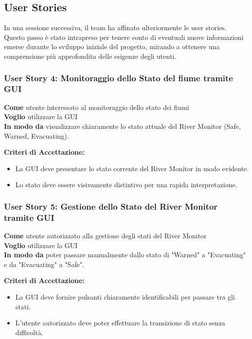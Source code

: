 \subsection{User Stories}

In una sessione successiva, il team ha affinato ulteriormente le user stories. Questo passo è stato intrapreso per tenere conto di eventuali nuove informazioni emerse durante lo sviluppo iniziale del progetto, mirando a ottenere una comprensione più approfondita delle esigenze degli utenti.

\subsubsection{User Story 4: Monitoraggio dello Stato del fiume tramite GUI}

\textbf{Come} utente interessato al monitoraggio dello stato dei fiumi \\
\textbf{Voglio} utilizzare la GUI \\
\textbf{In modo da} visualizzare chiaramente lo stato attuale del River Monitor (Safe, Warned, Evacuating).

\textbf{Criteri di Accettazione:}
\begin{itemize}
  \item La GUI deve presentare lo stato corrente del River Monitor in modo evidente.
  \item Lo stato deve essere visivamente distintivo per una rapida interpretazione.
\end{itemize}

\subsubsection{User Story 5: Gestione dello Stato del River Monitor tramite GUI}

\textbf{Come} utente autorizzato alla gestione degli stati del River Monitor \\
\textbf{Voglio} utilizzare la GUI \\
\textbf{In modo da}  poter passare manualmente dallo stato di "Warned" a "Evacuating" e da "Evacuating" a "Safe".

\textbf{Criteri di Accettazione:}
\begin{itemize}
  \item La GUI deve fornire pulsanti chiaramente identificabili per passare tra gli stati.
  \item L'utente autorizzato deve poter effettuare la transizione di stato senza difficoltà.
\end{itemize}

